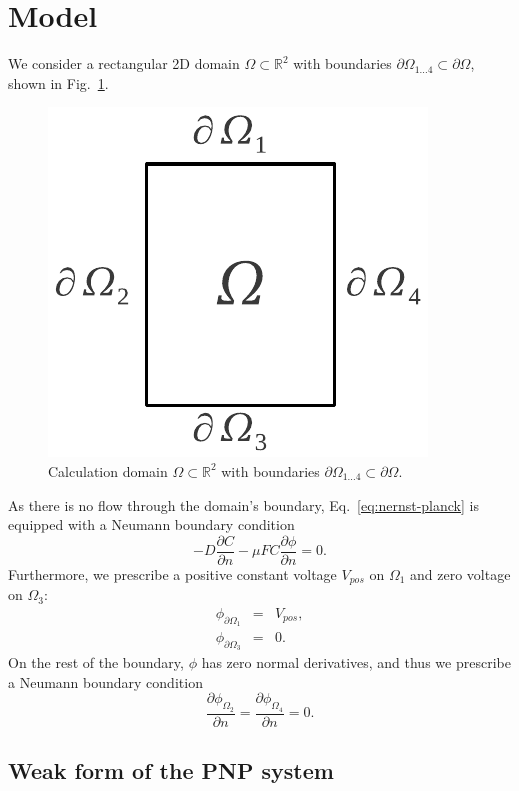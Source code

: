 \newpage
\section{Model}\label{sec:model}

We consider a rectangular 2D domain $\Omega\subset\mathbb{R}^2$ with boundaries 
$\partial\Omega_{1\ldots 4}\subset\partial\Omega$, shown in Fig.~\ref{fig:domain}.

\begin{figure}[!ht]
  \begin{centering}
  \includegraphics[width=0.2\columnwidth]{domain}
  \caption{\label{fig:domain} Calculation domain $\Omega\subset\mathbb{R}^2$
  	with boundaries $\partial\Omega_{1\ldots 4}\subset\partial\Omega$.}
  \end{centering}
\end{figure}

As there is no flow through the domain's boundary, Eq.~\eqref{eq:nernst-planck}
is equipped with a Neumann boundary condition 
\begin{equation}
  -D \frac{\partial C}{\partial n} - \mu F C \frac{\partial \phi} {\partial n} = 0.
  \label{eq:nernst-planck-boundary}
\end{equation}
Furthermore, we prescribe a positive constant voltage $V_{pos}$ 
on $\Omega_1$ and zero voltage on $\Omega_3$:
\begin{eqnarray}
  \phi_{\partial\Omega_1}&=&V_{pos},\\
  \phi_{\partial\Omega_3}&=&0.
  \label{eq:dirichlet}
\end{eqnarray}
On the rest of the boundary, $\phi$ has zero normal derivatives, and thus we prescribe 
a Neumann boundary condition
\begin{equation}
  \frac{\partial \phi_{\Omega_2}}{\partial n}=\frac{\partial \phi_{\Omega_4}}{\partial n}=0.
\end{equation}


\subsection{Weak form of the PNP system}


